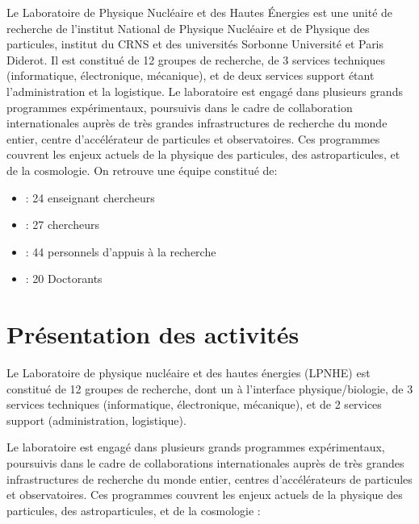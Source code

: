 \documentclass[french,a4paper,12pt]{report}
\begin{document}
  Le Laboratoire de Physique Nucléaire et des Hautes Énergies est une unité de recherche de l'institut National de Physique Nucléaire et de Physique des particules, institut du CRNS et des universités Sorbonne Université et Paris Diderot. Il est constitué de 12 groupes de recherche, de 3 services techniques (informatique, électronique, mécanique), et de deux services support étant l'administration et la logistique.
  Le laboratoire est engagé dans plusieurs grands programmes expérimentaux, poursuivis dans le cadre de collaboration internationales auprès de très grandes infrastructures de recherche du monde entier, centre d'accélérateur de particules et observatoires.
  Ces programmes couvrent les enjeux actuels de la physique des particules, des astroparticules, et de la cosmologie.
  On retrouve une équipe constitué de:
  \begin{itemize}
  \item : 24 enseignant chercheurs
  \item : 27 chercheurs
  \item : 44 personnels d'appuis à la recherche
  \item :	20 Doctorants
  \end{itemize}
  \newpage
  
  \section{Présentation des activités}
  Le Laboratoire de physique nucléaire et des hautes énergies (LPNHE) est constitué de 12 groupes de recherche, dont un à l’interface physique/biologie, de 3 services techniques (informatique, électronique, mécanique), et de 2 services support (administration, logistique).
  
  Le laboratoire est engagé dans plusieurs grands programmes expérimentaux, poursuivis dans le cadre de collaborations internationales auprès de très grandes infrastructures de recherche du monde entier, centres d’accélérateurs de particules et observatoires. Ces programmes couvrent les enjeux actuels de la physique des particules, des astroparticules, et de la cosmologie :
  
\end{document}
